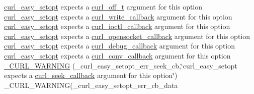 \begin{DoxyCompactItemize}
\item 
\hyperlink{easy_8h_a7b171739b7bb728b3b58b2e6ec454aa0}{curl\+\_\+easy\+\_\+setopt} expects a \hyperlink{curlbuild_8h_a494e2b4279dc064f7ed1d0abd602b28d}{curl\+\_\+off\+\_\+t} argument for this option \hyperlink{easy_8h_a7b171739b7bb728b3b58b2e6ec454aa0}{curl\+\_\+easy\+\_\+setopt} expects a \hyperlink{curl_8h_ad65e62dcde45b356254b0f25f38dd802}{curl\+\_\+write\+\_\+callback} argument for this option \hyperlink{easy_8h_a7b171739b7bb728b3b58b2e6ec454aa0}{curl\+\_\+easy\+\_\+setopt} expects a \hyperlink{curl_8h_ae0524f6ec082005e39eb275c71c59a3b}{curl\+\_\+ioctl\+\_\+callback} argument for this option \hyperlink{easy_8h_a7b171739b7bb728b3b58b2e6ec454aa0}{curl\+\_\+easy\+\_\+setopt} expects a \hyperlink{curl_8h_a1b8b8f3e1a4e538a6bb1dd83a3388547}{curl\+\_\+opensocket\+\_\+callback} argument for this option \hyperlink{easy_8h_a7b171739b7bb728b3b58b2e6ec454aa0}{curl\+\_\+easy\+\_\+setopt} expects a \hyperlink{curl_8h_a50147c55283ee1fa3322b0d5aff2326c}{curl\+\_\+debug\+\_\+callback} argument for this option \hyperlink{easy_8h_a7b171739b7bb728b3b58b2e6ec454aa0}{curl\+\_\+easy\+\_\+setopt} expects a \hyperlink{curl_8h_acb230bf6dbf7bcb6e4e8740ea42ca3b3}{curl\+\_\+conv\+\_\+callback} argument for this option \hyperlink{typecheck-gcc_8h_a303ce695f02a9c140c9e09dd415d12d6}{\+\_\+\+C\+U\+R\+L\+\_\+\+W\+A\+R\+N\+I\+NG} (\+\_\+curl\+\_\+easy\+\_\+setopt\+\_\+err\+\_\+seek\+\_\+cb,\char`\"{}curl\+\_\+easy\+\_\+setopt expects a \hyperlink{curl_8h_a8ea5d0b350bebdf47cfb237e7caac14a}{curl\+\_\+seek\+\_\+callback} argument for this option\char`\"{}) \+\_\+\+C\+U\+R\+L\+\_\+\+W\+A\+R\+N\+I\+NG(\+\_\+curl\+\_\+easy\+\_\+setopt\+\_\+err\+\_\+cb\+\_\+data
\item 

\end{DoxyCompactItemize}
